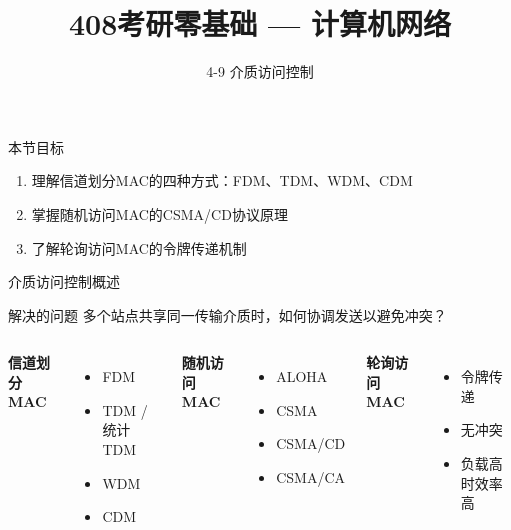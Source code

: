 \documentclass[10pt, aspectratio=169]{beamer}
\title{408考研零基础 --- 计算机网络}
\subtitle{4-9 介质访问控制}
\author{}
\date{}
\begin{document}
\begin{frame}{本节目标}
    \begin{enumerate}
        \item 理解信道划分MAC的四种方式：FDM、TDM、WDM、CDM
        \item 掌握随机访问MAC的CSMA/CD协议原理
        \item 了解轮询访问MAC的令牌传递机制
    \end{enumerate}
\end{frame}

\begin{frame}{介质访问控制概述}
    \begin{block}{解决的问题}
        多个站点共享同一传输介质时，如何协调发送以避免冲突？
    \end{block}
    \vspace{0.5em}
    \begin{columns}[t]
        \textbf{信道划分MAC}
        \begin{itemize}
            \item FDM
            \item TDM / 统计TDM
            \item WDM
            \item CDM
        \end{itemize}
        \pause
        \textbf{随机访问MAC}
        \begin{itemize}
            \item ALOHA
            \item CSMA
            \item CSMA/CD
            \item CSMA/CA
        \end{itemize}
        \pause
        \textbf{轮询访问MAC}
        \begin{itemize}
            \item 令牌传递
            \item 无冲突
            \item 负载高时效率高
        \end{itemize}
    \end{columns}
\end{frame}
\end{document}
